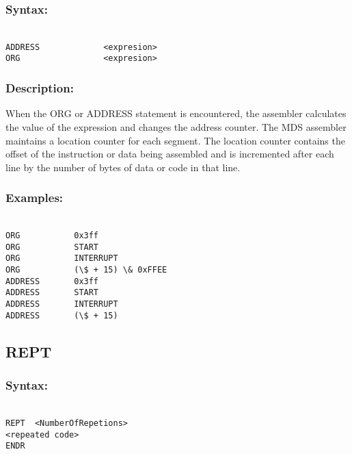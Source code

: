         \subsubsection{Syntax:}
        {
            ~\\
            \usecodefont        
            \verb'ADDRESS             <expresion>'\\
            \verb'ORG                 <expresion>'
        }
        \subsubsection{Description:}
        When the ORG or ADDRESS statement is encountered, the assembler calculates the value of the expression and changes the address counter. The MDS assembler maintains a location counter for each segment. The location counter contains the offset of the instruction or data being assembled and is incremented after each line by the number of bytes of data or code in that line.

        \subsubsection{Examples:}
        {
            ~\\
            \usecodefont
            \verb'ORG           0x3ff'\\
            \verb'ORG           START'\\
            \verb'ORG           INTERRUPT'\\
            \verb'ORG           (\$ + 15) \& 0xFFEE'\\
            \verb'ADDRESS       0x3ff'\\
            \verb'ADDRESS       START'\\
            \verb'ADDRESS       INTERRUPT'\\
            \verb'ADDRESS       (\$ + 15)'\\
        }
    \subsection{REPT}
        \subsubsection{Syntax:}
        {
            ~\\
            \usecodefont        
            \verb'REPT  <NumberOfRepetions>'\\
            \verb'<repeated code>'\\
            \verb'ENDR'
        }            

